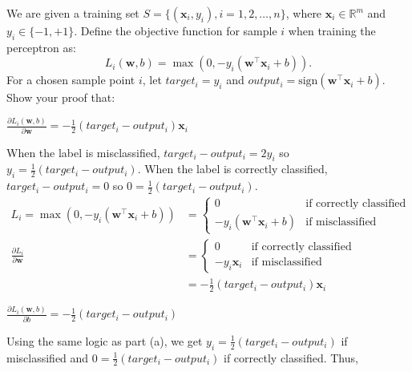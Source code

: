 \documentclass{article}
\newcommand{\R}{\mathbb{R}}
\newcommand{\x}{\mathbf{x}}
\newcommand{\w}{\mathbf{w}}
\begin{document}
\begin{probset}
\newpage

\begin{prob}
    We are given a training set $S = \{(\x_i, y_i), i = 1, 2, \ldots, n\}$, where $\x_i \in \R^m$ and $y_i \in \{-1, +1\}$. Define the objective function for sample $i$ when training the perceptron as:
    \[ L_i(\w, b) = \max(0, -y_i(\w^\top \x_i + b)). \]
    For a chosen sample point $i$, let $target_i = y_i$ and $output_i = \text{sign}(\w^\top \x_i + b)$. Show your proof that:

    \begin{subprobset}
    \begin{subprob}
        $\frac{\partial L_i(\w, b)}{\partial \w} = -\frac{1}{2} (target_i - output_i) \x_i$

        \begin{soln}
            When the label is misclassified, $target_i - output_i = 2y_i$ so $y_i = \frac{1}{2}(target_i - output_i)$. When the label is correctly classified, $target_i - output_i = 0$ so $0 = \frac{1}{2}(target_i - output_i)$.
            \begin{align*}
                L_i = \max(0, -y_i(\w^\top \x_i + b)) &= \begin{cases}
                    0 & \text{if correctly classified} \\
                    -y_i(\w^\top \x_i + b) & \text{if misclassified}
                \end{cases} \\
                \frac{\partial L_i}{\partial \w} &= \begin{cases}
                    0 & \text{if correctly classified} \\
                    -y_i \x_i & \text{if misclassified}
                \end{cases} \\
                &= -\frac{1}{2}(target_i - output_i) \x_i
            \end{align*}
        \end{soln}
    \end{subprob}

    \begin{subprob}
        $\frac{\partial L_i(\w, b)}{\partial b} = -\frac{1}{2} (target_i - output_i)$

        \begin{soln}
            Using the same logic as part (a), we get $y_i = \frac{1}{2}(target_i - output_i)$ if misclassified and $0 = \frac{1}{2}(target_i - output_i)$ if correctly classified. Thus,


\end{soln}
\end{subprob}
\end{subprobset}
\end{prob}
\end{probset}
\end{document}
